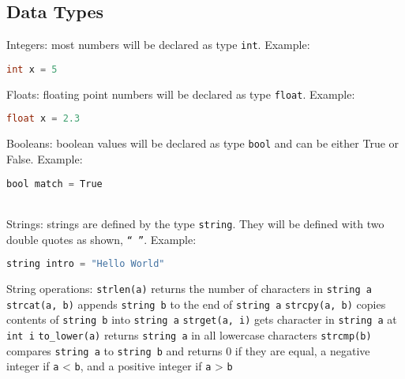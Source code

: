 \documentclass{article}
\begin{document}
\subsection{Data Types}
 \newline
Integers: most numbers will be declared as type {\ttfamily\texttt{int}}. Example:
\begin{lstlisting}[language=C]
int x = 5
\end{lstlisting}
Floats: floating point numbers will be declared as type {\ttfamily\texttt{float}}. Example:
\begin{lstlisting}[language=C]
float x = 2.3
\end{lstlisting}
Booleans: boolean values will be declared as type {\ttfamily\texttt{bool}} and can be either True or False. Example:
\begin{lstlisting}[language=C]
bool match = True
\end{lstlisting}
\ \\
 \newline
Strings: strings are defined by the type {\ttfamily\texttt{string}}. They will be defined with two double quotes as shown, {\ttfamily\texttt{“ ”}}. Example:
\begin{lstlisting}[language=C]
string intro = "Hello World"
\end{lstlisting}
String operations: \newline
{\ttfamily\texttt{strlen(a)}} returns the number of characters in {\ttfamily\texttt{string a}} \newline
{\ttfamily\texttt{strcat(a, b)}} appends {\ttfamily\texttt{string b}} to the end of {\ttfamily\texttt{string a}} \newline
{\ttfamily\texttt{strcpy(a, b)}} copies contents of {\ttfamily\texttt{string b}} into {\ttfamily\texttt{string a}} \newline
{\ttfamily\texttt{strget(a, i)}} gets character in {\ttfamily\texttt{string a}} at {\ttfamily\texttt{int i}} \newline
{\ttfamily\texttt{to\_lower(a)}} returns {\ttfamily\texttt{string a}} in all lowercase characters \newline
{\ttfamily\texttt{strcmp(b)}} compares {\ttfamily\texttt{string a}} to {\ttfamily\texttt{string b}} and returns 0 if they are equal, a negative integer if {\ttfamily\texttt{a}} < {\ttfamily\texttt{b}}, and a positive integer if {\ttfamily\texttt{a}} > {\ttfamily\texttt{b}} \newline \newline
\end{document}
